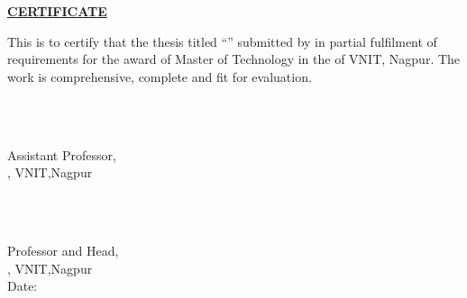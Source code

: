\vspace{\baselineskip}




\begin{centering}
\textbf{\large{\underline{CERTIFICATE}}}\\
\end{centering}
This is to certify that the thesis titled ``\textbf{\thesisTitle}'' submitted by  \textbf{\yourName} in partial fulfilment of requirements for the award of Master of Technology in the {\yourSchool}  of VNIT, Nagpur. The work is comprehensive, complete and fit for evaluation. \\[1.25cm]

\begin{minipage}{0.4\textwidth}
	\begin{flushleft} \large
		\emph{}\\[2cm] %
	\end{flushleft}
\end{minipage}
\begin{minipage}{0.7\textwidth}
	{\begin{center} 
		\textbf{\yourSupName}\\
			{Assistant Professor,\\ 
			\normalsize{\yourSchool, VNIT,Nagpur}}
	\end{center}}
\end{minipage}\\[1cm]

\begin{minipage}{0.75\textwidth}
	{\begin{center} 
		
		\begin{flushleft}
		\textbf{\yourHodName}\\
			{Professor and Head,\\
			 \normalsize{\yourSchool, VNIT,Nagpur}\\
			Date: {\sumbissionDate}}
		\end{flushleft}
	\end{center}}
\end{minipage}

    
    

    
    



